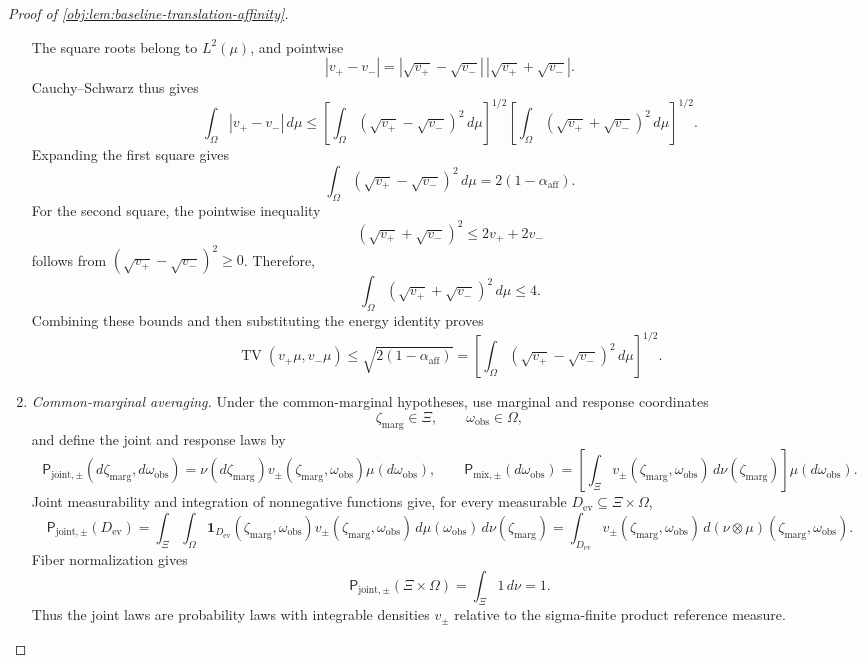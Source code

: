 \documentclass[11pt]{article}
\begin{document}
\begin{proof}[Proof of \cref{obj:lem:baseline-translation-affinity}]
\begin{enumerate}
The square roots belong to \(L^2(\mu)\), and pointwise
\[
|v_+-v_-|
=|\sqrt{v_+}-\sqrt{v_-}|\,
 |\sqrt{v_+}+\sqrt{v_-}|.
\]
Cauchy--Schwarz thus gives
\[
\int_\Omega|v_+-v_-|\,d\mu
\le
\left[\int_\Omega(\sqrt{v_+}-\sqrt{v_-})^2\,d\mu\right]^{1/2}
\left[\int_\Omega(\sqrt{v_+}+\sqrt{v_-})^2\,d\mu\right]^{1/2}.
\]
Expanding the first square gives
\[
\int_\Omega(\sqrt{v_+}-\sqrt{v_-})^2\,d\mu
=2(1-\alpha_{\mathrm{aff}}).
\]
For the second square, the pointwise inequality
\[
(\sqrt{v_+}+\sqrt{v_-})^2\le2v_++2v_-
\]
follows from \((\sqrt{v_+}-\sqrt{v_-})^2\ge0\). Therefore,
\[
\int_\Omega(\sqrt{v_+}+\sqrt{v_-})^2\,d\mu\le4.
\]
Combining these bounds and then substituting the energy identity proves
\[
\operatorname{TV}(v_+\mu,v_-\mu)
\le\sqrt{2(1-\alpha_{\mathrm{aff}})}
=
\left[\int_\Omega(\sqrt{v_+}-\sqrt{v_-})^2\,d\mu\right]^{1/2}.
\]

\item \emph{Common-marginal averaging.}
Under the common-marginal hypotheses, use marginal and response coordinates
\[
\zeta_{\mathrm{marg}}\in\Xi,
\qquad
\omega_{\mathrm{obs}}\in\Omega,
\]
and define the joint and response laws by
\[
\mathsf P_{\mathrm{joint},\pm}(d\zeta_{\mathrm{marg}},d\omega_{\mathrm{obs}})
=\nu(d\zeta_{\mathrm{marg}})v_\pm(\zeta_{\mathrm{marg}},\omega_{\mathrm{obs}})\mu(d\omega_{\mathrm{obs}}),
\qquad
\mathsf P_{\mathrm{mix},\pm}(d\omega_{\mathrm{obs}})
=\left[\int_\Xi v_\pm(\zeta_{\mathrm{marg}},\omega_{\mathrm{obs}})\,d\nu(\zeta_{\mathrm{marg}})\right]\mu(d\omega_{\mathrm{obs}}).
\]
Joint measurability and integration of nonnegative functions give, for every measurable
\(D_{\mathrm{ev}}\subseteq\Xi\times\Omega\),
\[
\mathsf P_{\mathrm{joint},\pm}(D_{\mathrm{ev}})
=\int_\Xi\int_\Omega
\mathbf1_{D_{\mathrm{ev}}}(\zeta_{\mathrm{marg}},\omega_{\mathrm{obs}})v_\pm(\zeta_{\mathrm{marg}},\omega_{\mathrm{obs}})\,d\mu(\omega_{\mathrm{obs}})\,d\nu(\zeta_{\mathrm{marg}})
=\int_{D_{\mathrm{ev}}}v_\pm(\zeta_{\mathrm{marg}},\omega_{\mathrm{obs}})\,d(\nu\otimes\mu)(\zeta_{\mathrm{marg}},\omega_{\mathrm{obs}}).
\]
Fiber normalization gives
\[
\mathsf P_{\mathrm{joint},\pm}(\Xi\times\Omega)
=\int_\Xi 1\,d\nu=1.
\]
Thus the joint laws are probability laws with integrable densities \(v_\pm\) relative to the sigma-finite product reference measure.


\end{enumerate}
\end{proof}
\end{document}
